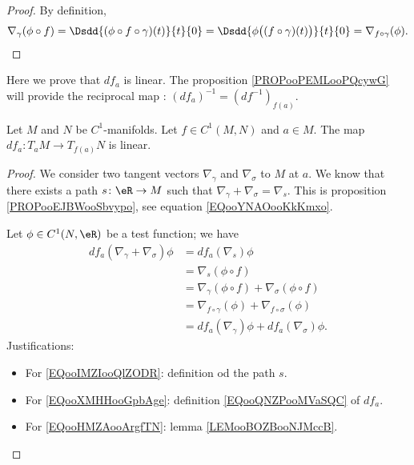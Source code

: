 \begin{proof}
	By definition,
	\begin{equation}
		\nabla_{\gamma}(\phi\circ f)=\Dsdd{ (\phi\circ f\circ \gamma)(t) }{t}{0}=\Dsdd{ \phi\big( (f\circ \gamma)(t) \big) }{t}{0}=\nabla_{f\circ\gamma}(\phi).
	\end{equation}
\end{proof}

Here we prove that \( df_a\) is linear. The proposition \ref{PROPooPEMLooPQcywG} will provide the reciprocal map : \( (df_a)^{-1}=(df^{-1})_{f(a)}\).
\begin{proposition}     \label{PROPooNRLVooChhiIS}
	Let \( M\) and \( N\) be \( C^1\)-manifolds. Let \( f\in C^1(M,N)\) and \( a\in M\). The map \( df_a\colon T_aM\to T_{f(a)}N\) is linear.
\end{proposition}

\begin{proof}
	We consider two tangent vectors \( \nabla_{\gamma}\) and \( \nabla_{\sigma}\) to \( M\) at \( a\). We know that there exists a path \( s\colon \eR\to M\) such that \( \nabla_{\gamma}+\nabla_{\sigma}=\nabla_s\). This is proposition \ref{PROPooEJBWooSbvypo}, see equation \eqref{EQooYNAOooKkKmxo}.

	Let \( \phi\in C^1(N,\eR)\) be a test function; we have
	\begin{subequations}
		\begin{align}
			df_a(\nabla_{\gamma}+\nabla_{\sigma})\phi & =df_a(\nabla_s)\phi  \label{EQooIMZIooQlZODR}                                           \\
			                                          & =\nabla_s(\phi\circ f)     \label{EQooXMHHooGpbAge}                                     \\
			                                          & =\nabla_{\gamma}(\phi\circ f)+\nabla_{\sigma}(\phi\circ f)                              \\
			                                          & =\nabla_{f\circ \gamma}(\phi)+\nabla_{f\circ \sigma}(\phi)     \label{EQooHMZAooArgfTN} \\
			                                          & =df_a(\nabla_{\gamma})\phi+df_a(\nabla_{\sigma})\phi.
		\end{align}
	\end{subequations}
	Justifications:
	\begin{itemize}
		\item For \eqref{EQooIMZIooQlZODR}: definition od the path \( s\).
		\item For \eqref{EQooXMHHooGpbAge}: definition \eqref{EQooQNZPooMVaSQC} of \( df_a\).
		\item For \eqref{EQooHMZAooArgfTN}: lemma \ref{LEMooBOZBooNJMccB}.
	\end{itemize}
\end{proof}


